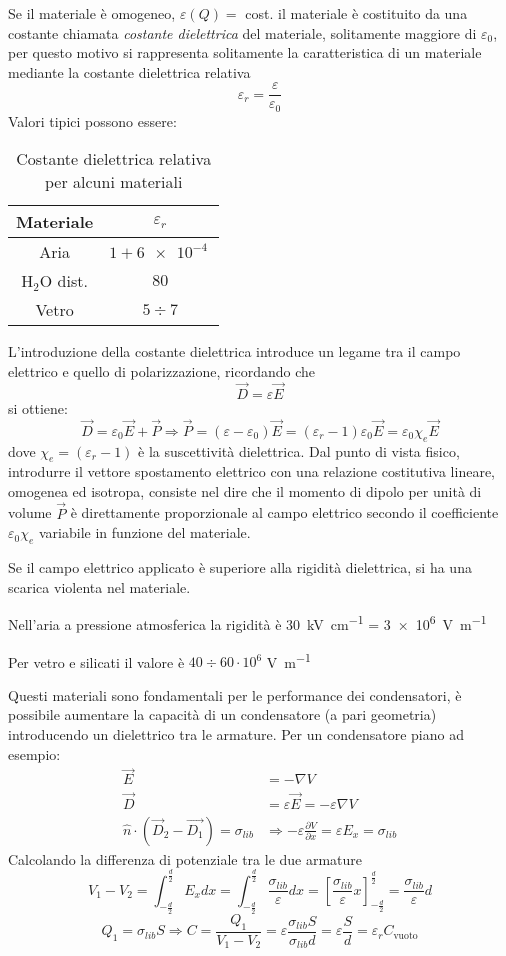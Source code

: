 Se il materiale è omogeneo, $\varepsilon(Q) = $ cost. il materiale
è costituito da una costante chiamata \textit{costante dielettrica}
del materiale, solitamente maggiore di $\varepsilon_0$, per questo
motivo si rappresenta solitamente la caratteristica di un materiale
mediante la costante dielettrica relativa
$$
\varepsilon_r = \frac{\varepsilon}{\varepsilon_0}
$$
\newpage
Valori tipici possono essere:

\begin{table}[H]
\centering
\begin{tabular}[]{c|c}
 Materiale & $\varepsilon_r$ \\ \hline
 Aria & $1 + \SI{6e-4}{}$ \\
 $\text{H}_2\text{O}$ dist. & $80$ \\
 Vetro & $5\div7$
 \end{tabular}
 \caption{Costante dielettrica relativa per alcuni materiali}
\end{table}

L'introduzione della costante dielettrica introduce un legame tra il 
campo elettrico e quello di polarizzazione, ricordando che
$$
\vec{D} = \varepsilon \vec{E}
$$
si ottiene:
$$
\vec{D} = \varepsilon_0\vec{E} + \vec{P} \Rightarrow \vec{P} 
= (\varepsilon-\varepsilon_0)\vec{E} = (\varepsilon_r-1)\varepsilon_0 \vec{E} = \varepsilon_0\chi_e\vec{E}
$$
dove $\chi_e = (\varepsilon_r -1)$ è la suscettività dielettrica.
Dal punto di vista fisico, introdurre il vettore spostamento
elettrico con una relazione costitutiva lineare, omogenea ed 
isotropa, consiste nel dire che il momento di dipolo per unità di 
volume $\vec{P}$ è direttamente proporzionale al campo elettrico
secondo il coefficiente $\varepsilon_0\chi_e$ variabile in funzione
del materiale.

Se il campo elettrico applicato è superiore alla rigidità 
dielettrica, si ha una scarica violenta nel materiale.

Nell'aria a pressione atmosferica la rigidità è \SI{30}{\kilo\volt\per\centi\meter} = \SI{3e6}{\volt\per\meter}

Per vetro e silicati il valore è $40 \div 60 \cdot 10^6$
\si{\volt\per\meter} 

Questi materiali sono fondamentali per le performance dei condensatori,
è possibile aumentare la capacità di un condensatore (a pari geometria)
introducendo un dielettrico tra le armature. Per un condensatore
piano ad esempio:
\begin{align*}
\vec{E} &= -\nabla V \\
\vec{D} &= \varepsilon\vec{E} = -\varepsilon\nabla V \\
\hat{n}\cdot (\vec{D}_2-\vec{D_1}) = \sigma_{lib} &\Rightarrow -\varepsilon\frac{\partial V}{\partial x} = \varepsilon E_x = \sigma_{lib}
\end{align*}
Calcolando la differenza di potenziale tra le due armature
$$
V_1-V_2 = \int_{-\frac{d}{2}}^{\frac{d}{2}}E_x dx =
\int_{-\frac{d}{2}}^{\frac{d}{2}}\frac{\sigma_{lib}}{\varepsilon}dx = 
\left[\frac{\sigma_{lib}}{\varepsilon}x \right]_{-\frac{d}{2}}^{\frac{d}{2}} = \frac{\sigma_{lib}}{\varepsilon}d
$$
$$
Q_1 = \sigma_{lib}S \Rightarrow C = \frac{Q_1}{V_1-V_2} = 
\varepsilon\frac{\sigma_{lib}S}{\sigma_{lib}d} = \varepsilon\frac{S}{d}
= \varepsilon_r C_{\text{vuoto}}
$$
